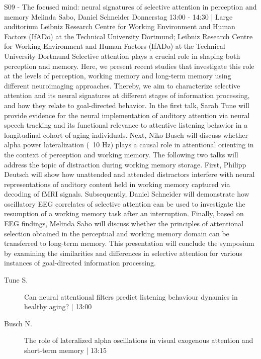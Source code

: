 
            \begin{symposium}
            {S09 - The focused mind: neural signatures of selective attention in perception and memory}
            {Melinda Sabo, Daniel Schneider }
            {Donnerstag 13:00 - 14:30 | Large auditorium}
            {Leibniz Research Centre for Working Environment and Human Factors (IfADo) at the Technical University Dortmund; Leibniz Research Centre for Working Environment and Human Factors (IfADo) at the Technical University Dortmund}
            Selective attention plays a crucial role in shaping both perception and memory. Here, we present recent studies that investigate this role at the levels of perception, working memory and long-term memory using different neuroimaging approaches. Thereby, we aim to characterize selective attention and its neural signatures at different stages of information processing, and how they relate to goal-directed behavior. In the first talk, Sarah Tune will provide evidence for the neural implementation of auditory attention via neural speech tracking and its functional relevance to attentive listening behavior in a longitudinal cohort of aging individuals. Next, Niko Busch will discuss whether alpha power lateralization (~10 Hz) plays a causal role in attentional orienting in the context of perception and working memory. The following two talks will address the topic of distraction during working memory storage. First, Philipp Deutsch will show how unattended and attended distractors interfere with neural representations of auditory content held in working memory captured via decoding of fMRI signals. Subsequently, Daniel Schneider will demonstrate how oscillatory EEG correlates of selective attention can be used to investigate the resumption of a working memory task after an interruption. Finally, based on EEG findings, Melinda Sabo will discuss whether the principles of attentional selection obtained in the perceptual and working memory domain can be transferred to long-term memory. This presentation will conclude the symposium by examining the similarities and differences in selective attention for various instances of goal-directed information processing.
            \begin{description}    
            
                \item [ Tune S.] Can neural attentional filters predict listening behaviour dynamics in healthy aging? \textcolor{mygray}{ | 13:00}    
                
                \item [ Busch N.] The role of lateralized alpha oscillations in visual exogenous attention and short-term memory \textcolor{mygray}{ | 13:15}    
                

\end{description}
\end{symposium}
